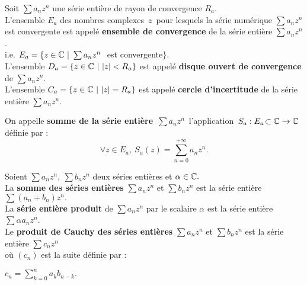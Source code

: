 Soit \(\sum a_nz^n\) une série entière de rayon de convergence \(R_a\).\\
L'ensemble \(E_a\) des nombres complexes \(\,z\,\) pour lesquels la série numérique \(\sum a_nz^n\) est convergente est appelé \textbf{ensemble de convergence} de la série entière \(\sum a_nz^n\).\vspace{0.1cm}\\
i.e. \(E_a =\{ z\in \CC \ | \ \sum a_nz^n\ \) est convergente$\}$.\vspace{0.2cm}\\
L'ensemble \(D_a = \{ z\in \CC \ \rvert \ |z|<R_a \} \) est appelé \textbf{disque ouvert de convergence} de  \(\sum a_nz^n\).\vspace{0.2cm}\\
L'ensemble \(C_a=\{ z\in \mathbb{C} \ \rvert \ |z|=R_a \} \) est appelé \textbf{cercle d'incertitude} de la série entière \(\sum a_nz^n\).

\vspace{1.5cm}

On appelle \textbf{somme de la série entière} \(\,\sum a_n z^n\,\) l'application \(\,S_a:E_a\!\subset \mathbb{C} \to \mathbb{C}\,\) définie par :\vspace{-0.2cm} \[\forall z\in E_a,\ S_a(z)=\sum_{n=0}^{+\infty}a_nz^n.\]

\vspace{1cm}

Soient \(\sum a_nz^n,\ \sum b_nz^n\) deux séries entières et \(\alpha \in \mathbb{C}.\)\vspace{0.2cm}\\
La \textbf{somme des séries entières}  \(\sum a_nz^n\) et \(\sum b_nz^n\) est la série entière \(\sum(a_n+b_n)z^n. \)\vspace{0.2cm}\\
La \textbf{série entière produit} de \(\sum a_nz^n\) par le scalaire \(\alpha\) est la série entière \(\sum \alpha a_nz^n\).\vspace{0.2cm}\\
Le \textbf{produit de Cauchy des séries entières} \(\sum a_n z^n\) et \(\sum b_nz^n\) est la série entière \(\sum c_n z^n\) \\
où \((c_n)\) est la suite définie par : \begin{small}\(\displaystyle c_n = \sum_{k=0}^{n}a_kb_{n-k}.\)\end{small}

